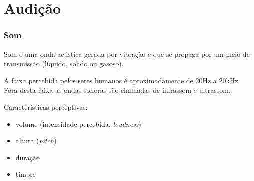 \section{Audição}

\begin{frame}[allowframebreaks]
  \frametitle{Som}

  Som é uma onda acústica gerada por vibração e que se propaga por um meio de transmissão (líquido, sólido ou gasoso).

  A faixa percebida pelos seres humanos é aproximadamente de 20Hz a 20kHz. Fora desta faixa
  as ondas sonoras são chamadas de infrassom e ultrassom.

  Características perceptivas:
  \begin{itemize}
  \item volume (intensidade percebida, \textit{loudness})
  \item altura (\textit{pitch})
  \item duração 
  \item timbre
  \end{itemize}

\end{frame}

